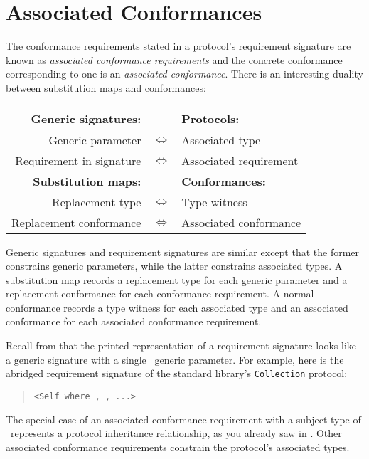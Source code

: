 \documentclass[../generics]{subfiles}
\begin{document}
\section{Associated Conformances}\label{associated conformances}
The conformance requirements stated in a protocol's requirement signature are known as \emph{associated conformance requirements} and the concrete conformance corresponding to one is an \emph{associated conformance}. There is an interesting duality between substitution maps and conformances:
\begin{center}
\begin{tabular}{rcl}
\toprule
\textbf{Generic signatures:}&&\textbf{Protocols:}\\
\midrule
Generic parameter&$\Leftrightarrow$&Associated type\\
Requirement in signature&$\Leftrightarrow$&Associated requirement\\
\midrule
\textbf{Substitution maps:}&&\textbf{Conformances:}\\
\midrule
Replacement type&$\Leftrightarrow$&Type witness\\
Replacement conformance&$\Leftrightarrow$&Associated conformance\\
\bottomrule
\end{tabular}
\end{center}
Generic signatures and requirement signatures are similar except that the former constrains generic parameters, while the latter constrains associated types. A substitution map records a replacement type for each generic parameter and a replacement conformance for each conformance requirement. A normal conformance records a type witness for each associated type and an associated conformance for each associated conformance requirement.

Recall from  that the printed representation of a requirement signature looks like a generic signature with a single \tSelf\ generic parameter. For example, here is the abridged requirement signature of the standard library's \texttt{Collection} protocol:
\begin{quote}
\texttt{<Self where , , ...>}
\end{quote}
The special case of an associated conformance requirement with a subject type of \tSelf\ represents a protocol inheritance relationship, as you already saw in . Other associated conformance requirements constrain the protocol's associated types.
\end{document}
